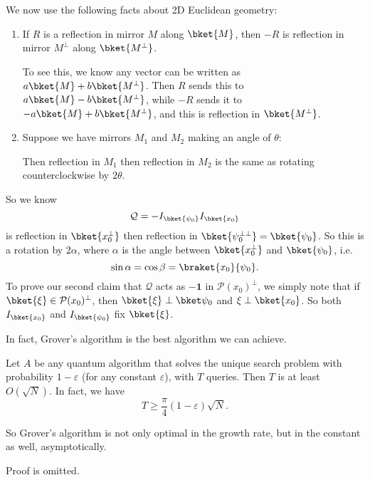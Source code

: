 \documentclass[a4paper]{article}
\begin{document}
We now use the following facts about 2D Euclidean geometry:
\begin{enumerate}
  \item If $R$ is a reflection in mirror $M$ along $\bket{M}$, then $-R$ is reflection in mirror $M^\perp$ along $\bket{M^\perp}$.

    To see this, we know any vector can be written as $a\bket{M} + b \bket{M^\perp}$. Then $R$ sends this to $a \bket{M} - b\bket{M^\perp}$, while $-R$ sends it to $-a \bket{M} + b \bket{M^\perp}$, and this is reflection in $\bket{M^\perp}$.

  \item Suppose we have mirrors $M_1$ and $M_2$ making an angle of $\theta$:
    \begin{center}
    \end{center}
    Then reflection in $M_1$ then reflection in $M_2$ is the same as rotating counterclockwise by $2\theta$.
\end{enumerate}
So we know
\[
  \mathcal{Q} = -I_{\bket{\psi_0}} I_{\bket{x_0}}
\]
is reflection in $\bket{x_0^\perp}$ then reflection in $\bket{\psi_0^{\perp\perp}} = \bket{\psi_0}$. So this is a rotation by $2\alpha$, where $\alpha$ is the angle between $\bket{x_0^\perp}$ and $\bket{\psi_0}$, i.e.
\[
  \sin \alpha = \cos \beta = \braket{x_0}{\psi_0}.
\]
To prove our second claim that $\mathcal{Q}$ acts as $-\mathbf{1}$ in $\mathcal{P}(x_0)^\perp$, we simply note that if $\bket{\xi} \in \mathcal{P}(x_0)^\perp$, then $\bket{\xi} \perp \bket\psi_0$ and $\xi \perp\bket{x_0}$. So both $I_{\bket{x_0}}$ and $I_{\bket{\psi_0}}$ fix $\bket{\xi}$.

In fact, Grover's algorithm is the best algorithm we can achieve.
\begin{thm}
  Let $A$ be any quantum algorithm that solves the unique search problem with probability $1 - \varepsilon$ (for any constant $\varepsilon$), with $T$ queries. Then $T$ is at least $O(\sqrt{N})$. In fact, we have
  \[
    T \geq \frac{\pi}{4}(1 - \varepsilon) \sqrt{N}.
  \]
\end{thm}
So Grover's algorithm is not only optimal in the growth rate, but in the constant as well, asymptotically.

Proof is omitted.
\end{document}
